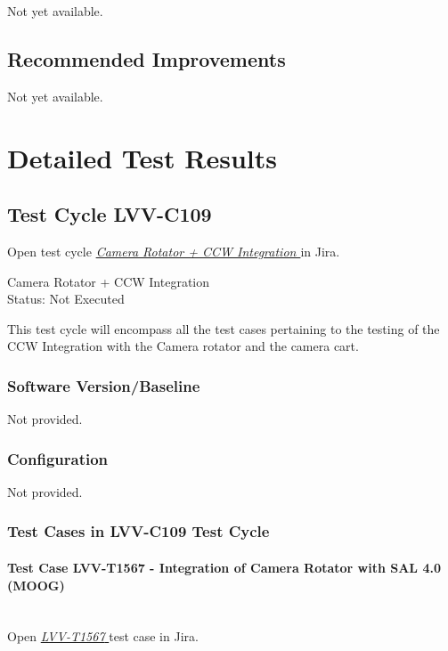 \documentclass[SE,lsstdraft,STR,toc]{lsstdoc}
\begin{document}
Not yet available.

\subsection{Recommended Improvements}
\label{sect:recommendations}

Not yet available.

\newpage
\section{Detailed Test Results}
\label{sect:detailedtestresults}

\subsection{Test Cycle LVV-C109 }

Open test cycle {\it \href{https://jira.lsstcorp.org/secure/Tests.jspa#/testrun/LVV-C109}{Camera Rotator + CCW Integration
}} in Jira.

Camera Rotator + CCW Integration
\\
Status: Not Executed

This test cycle will encompass all the test cases pertaining to the
testing of the CCW Integration with the Camera rotator and the camera
cart.


\subsubsection{Software Version/Baseline}
Not provided.

\subsubsection{Configuration}
Not provided.

\subsubsection{Test Cases in LVV-C109 Test Cycle}

\paragraph{Test Case LVV-T1567 - Integration of Camera Rotator with SAL 4.0 (MOOG)
 }\mbox{}\\

Open  \href{https://jira.lsstcorp.org/secure/Tests.jspa#/testCase/LVV-T1567}{\textit{ LVV-T1567 } }
test case in Jira.
\end{document}
